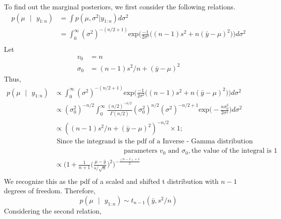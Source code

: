 \documentclass[11pt]{article}
\begin{document}
To find out the marginal posteriors, we first consider the following relations.
\begin{equation}
  \nonumber
  \begin{aligned}
    p(\mu \text{ } | \text{ } y_{1:n}) & = \int p(\mu, \sigma^2 \text{} | \text{} y_{1:n}) d \sigma^2\\
    & = \int_{0}^{\infty} (\sigma^2)^{-(n/2+1)  }\text{exp}\bigg(\frac{-1}{2 \sigma^2}\big((n-1)s^2 + n(\bar{y} - \mu)^2\big)\bigg) d \sigma^2 \\
  \end{aligned}
\end{equation}
Let
\begin{equation}
  \nonumber
  \begin{aligned}
    v_{0} & = n\\
    \sigma_{0} & = (n - 1)s^2/n + (\bar{y} - \mu)^2
  \end{aligned}
\end{equation}
Thus,
\begin{equation}
  \nonumber
  \begin{aligned}
    p(\mu \text{ } | \text{ } y_{1:n}) & \propto \int_{0}^{\infty} (\sigma^2)^{-(n/2+1)  }\text{exp}\bigg(\frac{-1}{2 \sigma^2}\big((n-1)s^2 + n(\bar{y} - \mu)^2\big)\bigg) d \sigma^2 \\
    & \propto (\sigma_{0}^2)^{-n/2} \int_{0}^{\infty} \frac{(n/2)^{-n/2}}{\Gamma(n/2)} (\sigma_{0}^{2})^{n/2} (\sigma^2)^{-n/2 + 1} \text{exp}\bigg(-\frac{n \sigma_{0}^2}{2 \sigma^2}\bigg) d \sigma^2\\
    & \propto ((n - 1)s^2/n + (\bar{y} - \mu)^2)^{-n/2} \times 1; \\
    & \text{ Since the integrand is the pdf of a Inverse - Gamma distribution with} \\
    & \hspace{10em}\text{parameters }v_{0} \text{ and } \sigma_{0}, \text{the value of the integral is }1 \\
    & \propto \bigg(1 + \frac{1}{n+1}\bigg(\frac{\mu - \bar{y}}{s/\sqrt{n}}\bigg)^2\bigg)^{-\frac{(n-1)+1}{2}}\\
  \end{aligned}
\end{equation}
We recognize this as the pdf of a scaled and shifted t distribution with $n-1$ degrees of freedom. Therefore,
\begin{equation}
  \nonumber
  p(\mu \text{ } | \text{ } y_{1:n}) \sim t_{n-1}(\bar{y}, s^2/n)
\end{equation}
Considering the second relation,
\end{document}
